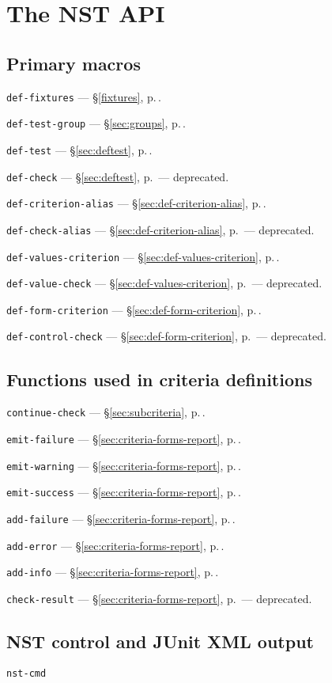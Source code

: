
\section{The NST API}
\def\secpageref#1{ --- \S\ref{#1}, p.\,\pageref{#1}}

\subsection{Primary macros}
\texttt{def-fixtures}\secpageref{fixtures}.

\texttt{def-test-group}\secpageref{sec:groups}.

\texttt{def-test}\secpageref{sec:deftest}.

\texttt{def-check}\secpageref{sec:deftest} --- deprecated.

\texttt{def-criterion-alias}\secpageref{sec:def-criterion-alias}.

\texttt{def-check-alias}\secpageref{sec:def-criterion-alias} ---
deprecated.

\texttt{def-values-criterion}\secpageref{sec:def-values-criterion}.

\texttt{def-value-check}\secpageref{sec:def-values-criterion} ---
deprecated.

\texttt{def-form-criterion}\secpageref{sec:def-form-criterion}.

\texttt{def-control-check}\secpageref{sec:def-form-criterion} ---
deprecated.

\subsection{Functions used in criteria definitions}
\texttt{continue-check}\secpageref{sec:subcriteria}.

\texttt{emit-failure}\secpageref{sec:criteria-forms-report}.

\texttt{emit-warning}\secpageref{sec:criteria-forms-report}.

\texttt{emit-success}\secpageref{sec:criteria-forms-report}.

\texttt{add-failure}\secpageref{sec:criteria-forms-report}.

\texttt{add-error}\secpageref{sec:criteria-forms-report}.

\texttt{add-info}\secpageref{sec:criteria-forms-report}.

\texttt{check-result}\secpageref{sec:criteria-forms-report} ---
deprecated.
             
\subsection{NST control and JUnit XML output}
\texttt{nst-cmd}

